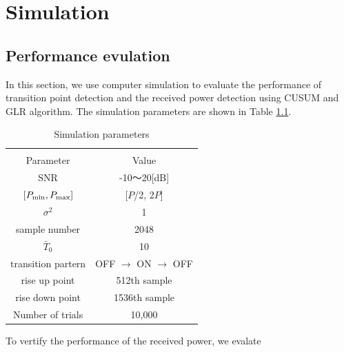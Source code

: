 \chapter[Simulation]{Simulation}
\label{chapter:Result}



\section{Performance evulation}
In this section, we use computer simulation to evaluate the performance of transition point detection and the received power detection using CUSUM and GLR algorithm. The simulation parameters are shown in Table \ref{parameter}.

\begin{table}[t]
\begin{center}
 \caption{\normalsize{Simulation parameters}}
 
\normalsize

  \begin{tabular}{c|c}
    & \\
    Parameter &Value \\ \hline
    SNR & -10〜20[dB] \\
    $[P_{{\rm min}},P_{{\rm max}}]$ & [$P$/2, 2$P$] \\
    $\sigma^2$ & 1 \\
    sample number & 2048 \\
    $\bar{T}_0$ & 10 \\
    transition partern & OFF $\rightarrow$ ON $\rightarrow$ OFF \\
    rise up point & 512th sample\\
    rise down point & 1536th sample\\
    Number of trials & 10,000 \\ \hline
  \end{tabular}
\label{parameter}
\end{center}
\end{table}

To vertify the performance of the received power, we evalate

